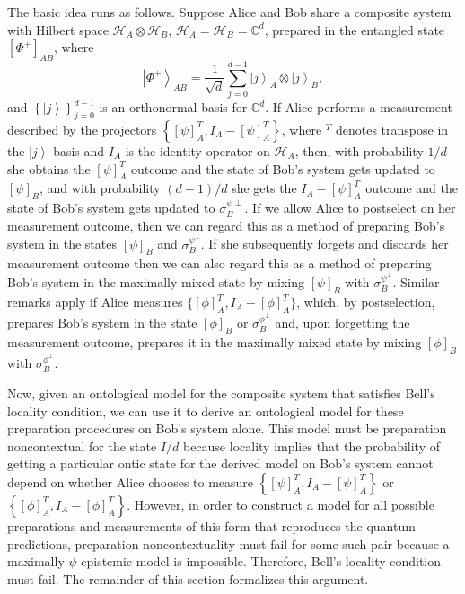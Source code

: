 \documentclass[DIV=calc,fontsize=12pt]{scrartcl} %
\theoremstyle{definition}
\theoremstyle{plain}
\newcommand{\Ket}[1]{\ensuremath{\left \vert #1 \right \rangle}}
\newcommand{\Proj}[1]{\ensuremath{\left [ #1 \right ]}}
\newcommand{\Hilb}[1][]{\ensuremath{\mathcal{H}_{#1}}}
\begin{document}
The basic idea runs as follows.  Suppose Alice and Bob share a
composite system with Hilbert space $\Hilb[A] \otimes \Hilb[B]$,
$\Hilb[A]=\Hilb[B]=\mathbb{C}^d$, prepared in the entangled state
$\Proj{\Phi^+}_{AB}$, where
\begin{equation}
\Ket{\Phi^+}_{AB} = \frac{1}{\sqrt{d}} \sum_{j=0}^{d-1} \Ket{j}_A \otimes
\Ket{j}_B,
\end{equation}
and $\left \{ \Ket{j} \right \}_{j=0}^{d-1}$ is an orthonormal basis
for $\mathbb{C}^d$.  If Alice performs a measurement described by the
projectors $\left \{ \Proj{\psi}_A^T, I_A - \Proj{\psi}_A^T \right
\}$, where $^T$ denotes transpose in the $\Ket{j}$ basis and $I_A$ is
the identity operator on $\Hilb[A]$, then, with probability $1/d$ she
obtains the $\Proj{\psi}_A^T$ outcome and the state of Bob's system
gets updated to $\Proj{\psi}_B$, and with probability $(d-1)/d$ she
gets the $I_A - \Proj{\psi}_A^T$ outcome and the state of Bob's system
gets updated to $\sigma^{\psi{\perp}}_B$.  If we allow Alice to
postselect on her measurement outcome, then we can regard this as a
method of preparing Bob's system in the states $\Proj{\psi}_B$ and
$\sigma^{\psi^{\perp}}_B$.  If she subsequently forgets and discards
her measurement outcome then we can also regard this as a method of
preparing Bob's system in the maximally mixed state by mixing
$\Proj{\psi}_B$ with $\sigma^{\psi^{\perp}}_B$.  Similar remarks apply
if Alice measures $\{\Proj{\phi}^T_A, I_A - \Proj{\phi}^T_A\}$, which,
by postselection, prepares Bob's system in the state $\Proj{\phi}_B$
or $\sigma^{\phi^{\perp}}_B$ and, upon forgetting the measurement
outcome, prepares it in the maximally mixed state by mixing
$\Proj{\phi}_B$ with $\sigma^{\phi^{\perp}}_B$.

Now, given an ontological model for the composite system that
satisfies Bell's locality condition, we can use it to derive an
ontological model for these preparation procedures on Bob's system
alone.  This model must be preparation noncontextual for the state
$I/d$ because locality implies that the probability of getting a
particular ontic state for the derived model on Bob's system cannot
depend on whether Alice chooses to measure $\left \{ \Proj{\psi}^T_A,
I_A - \Proj{\psi}^T_A \right \}$ or $\left \{ \Proj{\phi}^T_A, I_A -
\Proj{\phi}^T_A \right \}$.  However, in order to construct a model
for all possible preparations and measurements of this form that
reproduces the quantum predictions, preparation noncontextuality
must fail for some such pair because a maximally $\psi$-epistemic
model is impossible.  Therefore, Bell's locality condition must fail.
The remainder of this section formalizes this argument.
\end{document}

